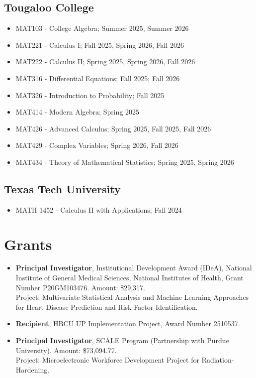 \documentclass[11pt]{article}
\begin{document}
\subsection*{Tougaloo College}
\begin{itemize}
	\item MAT103 - College Algebra; Summer 2025, Summer 2026
	\item MAT221 - Calculus I; Fall 2025, Spring 2026, Fall 2026
	\item MAT222 - Calculus II; Spring 2025, Spring 2026, Fall 2026
	\item MAT316 - Differential Equations; Fall 2025; Fall 2026
	\item MAT326 - Introduction to Probability; Fall 2025
	\item MAT414 - Modern Algebra; Spring 2025
	\item MAT426 - Advanced Calculus; Spring 2025, Fall 2025, Fall 2026
	\item MAT429 - Complex Variables; Spring 2026, Fall 2026
	\item MAT434 - Theory of Mathematical Statistics; Spring 2025, Spring 2026
\end{itemize}

\subsection*{Texas Tech University}
\begin{itemize}
	\item MATH 1452 - Calculus II with Applications; Fall 2024
\end{itemize}

\section*{Grants}

\begin{itemize}
	\item \textbf{Principal Investigator}, Institutional Development Award (IDeA), National Institute of General Medical Sciences, National Institutes of Health, Grant Number P20GM103476. Amount: \$29,317.\\
	      Project: Multivariate Statistical Analysis and Machine Learning Approaches for Heart Disease Prediction and Risk Factor Identification.
	\item \textbf{Recipient}, HBCU UP Implementation Project, Award Number 2510537.
	\item \textbf{Principal Investigator}, SCALE Program (Partnership with Purdue University). Amount: \$73,094.77.\\
	      Project: Microelectronic Workforce Development Project for Radiation-Hardening.
\end{itemize}
\end{document}
